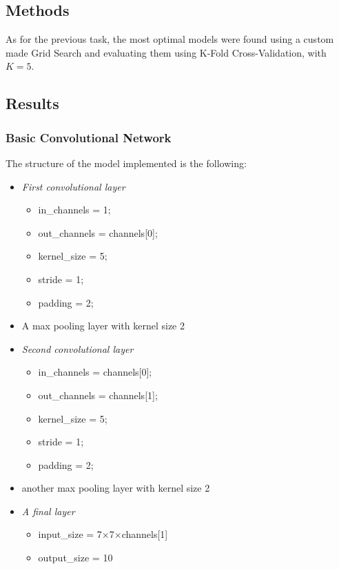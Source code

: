 \documentclass[11pt,a4paper,twocolumn]{IEEEtran}
\begin{document}
		\subsection{\textbf{Methods}}
			As for the previous task, the most optimal models were found using a custom made Grid Search and evaluating them using K-Fold Cross-Validation, with $K=5$.
			
			\subsection{\textbf{Results}}
			\subsubsection{Basic Convolutional Network}
			The structure of the model implemented is the following:
			\begin{itemize}
				\item \textit{First convolutional layer}
				\begin{itemize}
					\item in\_channels = 1;
					\item out\_channels = channels[0];
					\item kernel\_size = 5;
					\item stride = 1;
					\item padding = 2;
				\end{itemize} 
				\item A max pooling layer with kernel size 2
				\item \textit{Second convolutional layer}
				\begin{itemize}
					\item in\_channels = channels[0];
					\item out\_channels = channels[1];
					\item kernel\_size = 5;
					\item stride = 1;
					\item padding = 2;
				\end{itemize} 
				\item another max pooling layer with kernel size 2
				\item \textit{A final layer}
				\begin{itemize}
					\item input\_size = 7$\times$7$\times$channels[1]
					\item output\_size = 10
				\end{itemize}
			\end{itemize}
\end{document}
